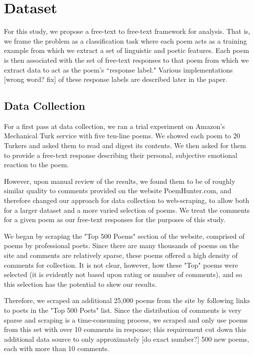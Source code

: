 \documentclass[11pt]{article}
\begin{document}
\section{Dataset}
For this study, we propose a free-text to free-text framework for analysis. That is, we frame the problem as a classification task where each poem acts as a training example from which we extract a set of linguistic and poetic features. Each poem is then associated with the set of free-text responses to that poem from which we extract data to act as the poem's ``response label." Various implementations [wrong word? fix] of these response labels are described later in the paper.

\subsection*{Data Collection}
For a first pass at data collection, we ran a trial experiment on Amazon's Mechanical Turk service with five ten-line poems. We showed each poem to 20 Turkers and asked them to read and digest its contents. We then asked for them to provide a free-text response describing their personal, subjective emotional reaction to the poem. 

However, upon manual review of the results, we found them to be of roughly similar quality to comments provided on the website PoemHunter.com, and therefore changed our approach for data collection to web-scraping, to allow both for a larger dataset and a more varied selection of poems. We treat the comments for a given poem as our free-text responses for the purposes of this study.

We began by scraping the "Top 500 Poems" section of the website, comprised of poems by professional poets. Since there are many thousands of poems on the site and comments are relatively sparse, these poems offered a high density of comments for collection. It is not clear, however, how these "Top" poems were selected (it is evidently not based upon rating or number of comments), and so this selection has the potential to skew our results.

Therefore, we scraped an additional 25,000 poems from the site by following links to poets in the "Top 500 Poets" list. Since the distribution of comments is very sparse and scraping is a time-consuming process, we scraped and only use poems from this set with over 10 comments in response; this requirement cut down this additional data source to only approximately [do exact number?] 500 new poems, each with more than 10 comments.
\end{document}
